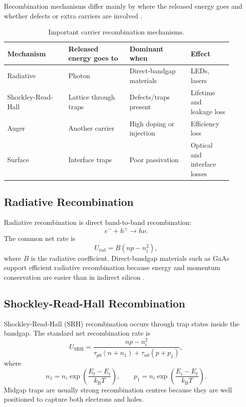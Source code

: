 \documentclass[11pt,a4paper]{article}
\newcommand{\kb}{k_{\mathrm{B}}}
\newcommand{\nint}{n_i}
\begin{document}
Recombination mechanisms differ mainly by where the released energy goes and whether defects or extra carriers are involved \cite{entner2007,sze2007}.

\begin{table}[h]
\centering
\caption{Important carrier recombination mechanisms.}
\begin{tabular}{p{0.25\linewidth}p{0.25\linewidth}p{0.25\linewidth}p{0.17\linewidth}}
\toprule
Mechanism & Released energy goes to & Dominant when & Effect\\
\midrule
Radiative & Photon & Direct-bandgap materials & LEDs, lasers\\
Shockley-Read-Hall & Lattice through traps & Defects/traps present & Lifetime and leakage loss\\
Auger & Another carrier & High doping or injection & Efficiency loss\\
Surface & Interface traps & Poor passivation & Optical and interface losses\\
\bottomrule
\end{tabular}
\end{table}

\subsection{Radiative Recombination}

Radiative recombination is direct band-to-band recombination:
\begin{equation}
  e^-+h^+\rightarrow h\nu .
\end{equation}
The common net rate is
\begin{equation}
  U_{\mathrm{rad}}=B(np-\nint^2),
\end{equation}
where \(B\) is the radiative coefficient. Direct-bandgap materials such as GaAs support efficient radiative recombination because energy and momentum conservation are easier than in indirect silicon \cite{entner2007,nptel_band}.

\subsection{Shockley-Read-Hall Recombination}

Shockley-Read-Hall (SRH) recombination occurs through trap states inside the bandgap. The standard net recombination rate is \cite{shockley1952,hall1952,sze2007}
\begin{equation}
  U_{\mathrm{SRH}}=
  \frac{np-\nint^2}
  {\tau_{p0}(n+n_1)+\tau_{n0}(p+p_1)} ,
\end{equation}
where
\begin{equation}
  n_1=\nint\exp\left(\frac{E_t-E_i}{\kb T}\right),\qquad
  p_1=\nint\exp\left(\frac{E_i-E_t}{\kb T}\right).
\end{equation}
Midgap traps are usually strong recombination centres because they are well positioned to capture both electrons and holes.
\end{document}
